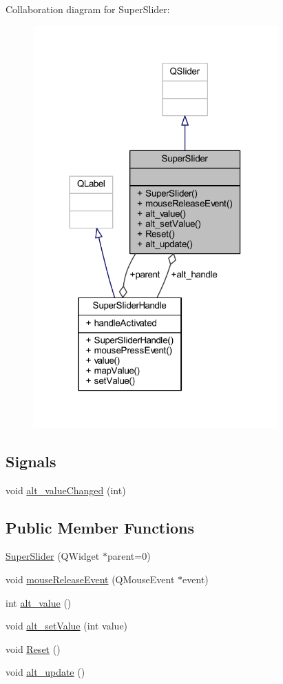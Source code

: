 Collaboration diagram for Super\+Slider\+:
\nopagebreak
\begin{figure}[H]
\begin{center}
\leavevmode
\includegraphics[width=266pt]{class_super_slider__coll__graph}
\end{center}
\end{figure}
\subsection*{Signals}
\begin{DoxyCompactItemize}
\item 
void \hyperlink{class_super_slider_ad061aa26ff1184c5d2483b39df5e4744}{alt\+\_\+value\+Changed} (int)
\end{DoxyCompactItemize}
\subsection*{Public Member Functions}
\begin{DoxyCompactItemize}
\item 
\hyperlink{class_super_slider_a1ced83868e54ebc4cf04bd16839c63be}{Super\+Slider} (Q\+Widget $\ast$parent=0)
\item 
void \hyperlink{class_super_slider_ac008206439cf573a9947626c916559d5}{mouse\+Release\+Event} (Q\+Mouse\+Event $\ast$event)
\item 
int \hyperlink{class_super_slider_a3163146dc0b994d09b17ff2722ff4d9c}{alt\+\_\+value} ()
\item 
void \hyperlink{class_super_slider_a1f6984cb59675c75c7c556f596fea804}{alt\+\_\+set\+Value} (int value)
\item 
void \hyperlink{class_super_slider_aee1cced49be3361b1d2262cbcd49fb77}{Reset} ()
\item 
void \hyperlink{class_super_slider_af8067e0fa6ea94d1b7e03fa377b5b1e7}{alt\+\_\+update} ()
\end{DoxyCompactItemize}
